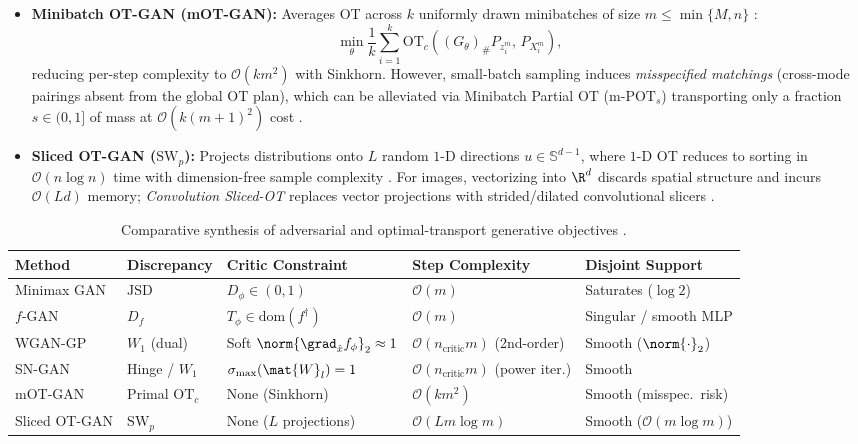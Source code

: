 \documentclass[../../../../master.tex]{subfiles}
\begin{document}
\begin{itemize}
  \item \textbf{Minibatch OT-GAN (mOT-GAN):} Averages OT across $k$ uniformly drawn minibatches of size $m \le \min\{M, n\}$ :
  \begin{equation}
    \label{eq:gan:mot}
    \min_{\theta} \frac{1}{k} \sum_{i=1}^{k} \mathrm{OT}_c\!\left((G_\theta)_\# P_{z_i^m},\, P_{X_i^m}\right),
  \end{equation}
  reducing per-step complexity to $\mathcal{O}(km^2)$ with Sinkhorn. However, small-batch sampling induces \emph{misspecified matchings} (cross-mode pairings absent from the global OT plan), which can be alleviated via Minibatch Partial OT ($\mathrm{m\text{-}POT}_s$) transporting only a fraction $s \in (0,1]$ of mass at $\mathcal{O}(k(m+1)^2)$ cost .
  \item \textbf{Sliced OT-GAN ($\mathrm{SW}_p$):} Projects distributions onto $L$ random $1$-D directions $u \in \mathbb{S}^{d-1}$, where $1$-D OT reduces to sorting in $\mathcal{O}(n \log n)$ time with dimension-free sample complexity . For images, vectorizing into $\R^d$ discards spatial structure and incurs $\mathcal{O}(Ld)$ memory; \emph{Convolution Sliced-OT} replaces vector projections with strided/dilated convolutional slicers .
\end{itemize}

\begin{table}[htbp]
\centering
{\small
\begin{tabularx}{\textwidth}{@{}l >{\raggedright\arraybackslash}X >{\raggedright\arraybackslash}X >{\raggedright\arraybackslash}X >{\raggedright\arraybackslash}X@{}}
\toprule
\textbf{Method} & \textbf{Discrepancy} & \textbf{Critic Constraint} & \textbf{Step Complexity} & \textbf{Disjoint Support} \\
\midrule
Minimax GAN & $\mathrm{JSD}$ & $D_\phi \in (0,1)$ & $\mathcal{O}(m)$ & Saturates ($\log 2$) \\
$f$-GAN & $D_f$ & $T_\phi \in \mathrm{dom}(f^\dagger)$ & $\mathcal{O}(m)$ & Singular / smooth MLP \\
WGAN-GP & $W_1$ (dual) & Soft $\norm{\grad_{\hat{x}} f_\phi}_2 \approx 1$ & $\mathcal{O}(n_{\mathrm{critic}} m)$ (2nd-order) & Smooth ($\norm{\cdot}_2$) \\
SN-GAN & Hinge / $W_1$ & $\sigma_{\max}(\mat{W}_l) = 1$ & $\mathcal{O}(n_{\mathrm{critic}} m)$ (power iter.) & Smooth \\
mOT-GAN & Primal $\mathrm{OT}_c$ & None (Sinkhorn) & $\mathcal{O}(km^2)$ & Smooth (misspec.\ risk) \\
Sliced OT-GAN & $\mathrm{SW}_p$ & None ($L$ projections) & $\mathcal{O}(L m \log m)$ & Smooth ($\mathcal{O}(m\log m)$) \\
\bottomrule
\end{tabularx}
}
\caption{Comparative synthesis of adversarial and optimal-transport generative objectives  .}
\label{tab:gan:complexity}
\end{table}
\end{document}
